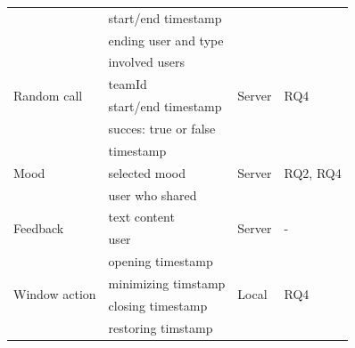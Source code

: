 \begin{table}[h]
\begin{tabularx}{.9\textwidth}{l X l l}
                                             & start/end timestamp                    &                         &                               \\
                                             & ending user and type                   &                         &                               \\
        \midrule
        \multirow{4}{*}{Random call}         & involved users                         & \multirow{4}{*}{Server} & \multirow{4}{*}{RQ4}          \\
                                             & teamId                                 &                         &                               \\
                                             & start/end timestamp                    &                         &                               \\
                                             & succes: true or false                  &                         &                               \\
        \midrule
        \multirow{3}{*}{Mood}                & timestamp                              & \multirow{3}{*}{Server} & \multirow{3}{*}{RQ2, RQ4}     \\
                                             & selected mood                          &                         &                               \\
                                             & user who shared                        &                         &                               \\
        \midrule
        \multirow{2}{*}{Feedback}            & text content                   & \multirow{2}{*}{Server} & \multirow{2}{*}{-}            \\
                                             & user                                   &                         &                               \\
        \midrule
        \multirow{4}{*}{Window action}       & opening timestamp                      & \multirow{4}{*}{Local}  & \multirow{4}{*}{RQ4    }      \\
                                             & minimizing timstamp                    &                         &                               \\
                                             & closing timestamp                      &                         &                               \\
                                             & restoring timstamp                     &                         &                               \\


\end{tabularx}
\end{table}
